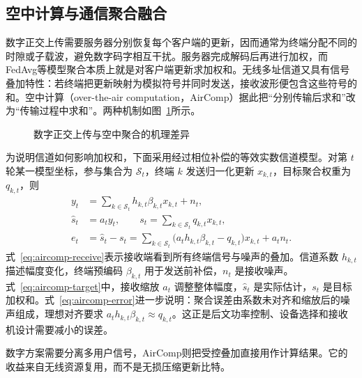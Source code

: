 \subsection{空中计算与通信聚合融合}\label{subsec:aircomp}

数字正交上传需要服务器分别恢复每个客户端的更新，因而通常为终端分配不同的时隙或子载波，避免数字码字相互干扰。服务器完成解码后再进行加权，而FedAvg等模型聚合本质上就是对客户端更新求加权和。无线多址信道又具有信号叠加特性：若终端把更新映射为模拟符号并同时发送，接收波形便包含这些符号的和。空中计算（over-the-air computation，AirComp）据此把“分别传输后求和”改为“传输过程中求和”\cite{Amiri2019OTA,Zhu2020BroadbandAnalog,ZhuLi2020IntegratedAirComp}。两种机制如图~\ref{fig:digital-aircomp}所示。

\begin{figure}[t]
  \centering
  \resizebox{0.94\textwidth}{!}{}
  \caption{数字正交上传与空中聚合的机理差异\protect\cite{Amiri2019OTA,Zhu2020BroadbandAnalog,ZhuLi2020IntegratedAirComp}}
  \label{fig:digital-aircomp}
\end{figure}

为说明信道如何影响加权和，下面采用经过相位补偿的等效实数信道模型。对第 \(t\) 轮某一模型坐标，参与集合为 \(\mathcal S_t\)，终端 \(k\) 发送归一化更新 \(x_{k,t}\)，目标聚合权重为 \(q_{k,t}\)，则
\begin{subequations}\label{eq:aircomp}
  \begin{align}
    y_t &= \sum_{k\in\mathcal S_t}h_{k,t}\beta_{k,t}x_{k,t}+n_t,\label{eq:aircomp-receive}\\
    \widehat{s}_t &= a_t y_t,\qquad
    s_t=\sum_{k\in\mathcal S_t}q_{k,t}x_{k,t},\label{eq:aircomp-target}\\
    e_t &= \widehat{s}_t-s_t
    =\sum_{k\in\mathcal S_t}
      \bigl(a_t h_{k,t}\beta_{k,t}-q_{k,t}\bigr)x_{k,t}+a_t n_t.\label{eq:aircomp-error}
  \end{align}
\end{subequations}
式~\eqref{eq:aircomp-receive}表示接收端看到所有终端信号与噪声的叠加。信道系数 \(h_{k,t}\) 描述幅度变化，终端预编码 \(\beta_{k,t}\) 用于发送前补偿，\(n_t\) 是接收噪声。式~\eqref{eq:aircomp-target}中，接收缩放 \(a_t\) 调整整体幅度，\(\widehat{s}_t\) 是实际估计，\(s_t\) 是目标加权和。式~\eqref{eq:aircomp-error}进一步说明：聚合误差由系数未对齐和缩放后的噪声组成，理想对齐要求 \(a_t h_{k,t}\beta_{k,t}\approx q_{k,t}\)。这正是后文功率控制、设备选择和接收机设计需要减小的误差。

数字方案需要分离多用户信号，AirComp则把受控叠加直接用作计算结果。它的收益来自无线资源复用，而不是无损压缩更新比特。

